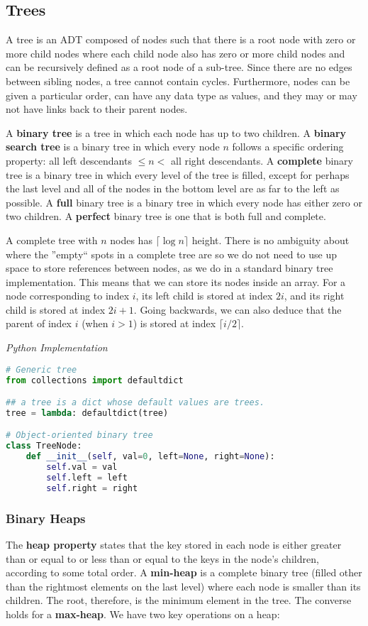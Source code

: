 \documentclass{article}
\begin{document}
    \subsection{Trees}
    A tree is an ADT composed of nodes such that there is a root node with zero or more child nodes where each child node also has zero or more child nodes and can be recursively defined as a root node of a sub-tree. Since there are no edges between sibling nodes, a tree cannot contain cycles. Furthermore, nodes can be given a particular order, can have any data type as values, and they may or may not have links back to their parent nodes.
    
    A \textbf{binary tree} is a tree in which each node has up to two children. A \textbf{binary search tree} is a binary tree in which every node $n$ follows a specific ordering property: all left descendants $\leq n <$ all right descendants. A \textbf{complete} binary tree is a binary tree in which every level of the tree is filled, except for perhaps the last level and all of the nodes in the bottom level are as far to the left as possible. A \textbf{full} binary tree is a binary tree in which every node has either zero or two children. A \textbf{perfect} binary tree is one that is both full and complete.
    
    A complete tree with $n$ nodes has $\lceil \log n \rceil$ height. There is no ambiguity about where the ''empty`` spots in a complete tree are so we do not need to use up space to store references between nodes, as we do in a standard binary tree implementation. This means that we can store its nodes inside an array. For a node corresponding to index $i$, its left child is stored at index $2i$, and its right child is stored at index $2i + 1$. Going backwards, we can also deduce that the parent of index $i$ (when $i > 1$) is stored at index $\lceil i/2 \rceil$.

\vspace{8pt} \emph{Python Implementation}
\begin{lstlisting}[language=Python]
# Generic tree
from collections import defaultdict

## a tree is a dict whose default values are trees. 
tree = lambda: defaultdict(tree)

# Object-oriented binary tree
class TreeNode:
    def __init__(self, val=0, left=None, right=None):
        self.val = val
        self.left = left
        self.right = right
\end{lstlisting}
    
    \subsubsection{Binary Heaps}
    The \textbf{heap property} states that the key stored in each node is either greater than or equal to or less than or equal to the keys in the node's children, according to some total order. A \textbf{min-heap} is a complete binary tree (filled other than the rightmost elements on the last level) where each node is smaller than its children. The root, therefore, is the minimum element in the tree. The converse holds for a \textbf{max-heap}. We have two key operations on a heap: 
    
\end{document}
